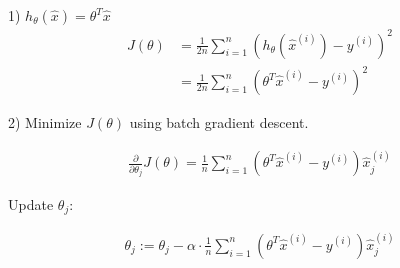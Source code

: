 \begin{answer}

1) $h_\theta (\hat{x}) = \theta^T \hat{x}$
\begin{align*}
    J(\theta) &= \frac{1}{2n}\sum_{i=1}^{n} \left(h_\theta (\hat{x}^{(i)}) - y^{(i)}\right)^2 \\
    &= \frac{1}{2n}\sum_{i=1}^{n} \left(\theta^T \hat{x}^{(i)} - y^{(i)}\right)^2
\end{align*}

2) Minimize $J(\theta)$ using batch gradient descent.

\begin{align*}
    \frac{\partial}{\partial\theta_j}J(\theta) = \frac{1}{n}\sum_{i=1}^{n} \left(\theta^T \hat{x}^{(i)} - y^{(i)}\right)\hat{x}^{(i)}_j 
\end{align*}

Update $\theta_j$:

\begin{align*}
    \theta_j := \theta_j - \alpha \cdot \frac{1}{n}\sum_{i=1}^{n} \left(\theta^T \hat{x}^{(i)} - y^{(i)}\right)\hat{x}^{(i)}_j 
\end{align*}

\end{answer}
